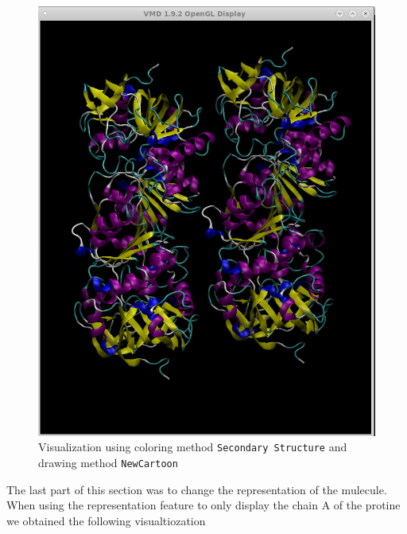 \documentclass[11pt]{article}
\makeatletter
\def\maxwidth{\ifdim\Gin@nat@width>\linewidth\linewidth
    \else\Gin@nat@width\fi}
\let\Oldincludegraphics\includegraphics
\renewcommand{\includegraphics}[1]{\Oldincludegraphics[width=.8\maxwidth]{#1}}
\makeatother
\begin{document}
\begin{figure}
\centering
\includegraphics{Screenshot_ladh_new_vis.png}
\caption{Visualization using coloring method
\texttt{Secondary\ Structure} and drawing method \texttt{NewCartoon}}
\end{figure}

The last part of this section was to change the representation of the
mulecule. When using the representation feature to only display the
chain A of the protine we obtained the following visualtiozation
\end{document}
